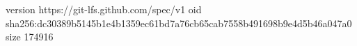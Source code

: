 version https://git-lfs.github.com/spec/v1
oid sha256:dc30389b5145b1e4b1359ec61bd7a76cb65cab7558b491698b9e4d5b46a047a0
size 174916
